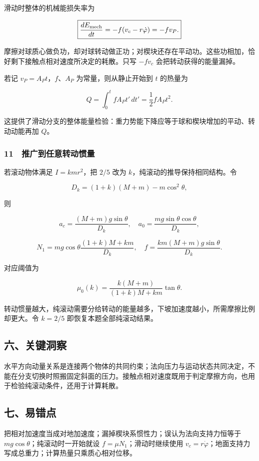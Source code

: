 \documentclass[12pt,a4paper,fontset=fandol]{ctexart}
\begin{document}
滑动时整体的机械能损失率为

\[\boxed{\frac{dE_{\rm mech}}{dt}=-f(v_c-r\dot\varphi)=-fv_P.}\]

摩擦对球质心做负功，却对球转动做正功；对楔块还存在平动功。这些功相加，恰好剩下接触点相对速度所决定的耗散。只写
\(-fv_c\) 会把转动获得的能量漏掉。

若记 \(v_P=A_Pt\)，\(f\)、\(A_P\) 为常量，则从静止开始到 \(t\) 的热量为

\[Q=\int_0^t fA_Pt'\,dt'=\frac12fA_Pt^2.\]

这提供了滑动分支的整体能量检验：重力势能下降应等于球和楔块增加的平动、转动动能再加
\(Q\)。

\subsubsection{11　推广到任意转动惯量}\label{ux63a8ux5e7fux5230ux4efbux610fux8f6cux52a8ux60efux91cf}

若滚动物体满足 \(I=kmr^2\)，把 \(2/5\) 改为
\(k\)，纯滚动的推导保持相同结构。令

\[D_k=(1+k)(M+m)-m\cos^2\theta,\]

则

\[a_c=\frac{(M+m)g\sin\theta}{D_k},\quad
a_0=\frac{mg\sin\theta\cos\theta}{D_k},\]

\[N_1=mg\cos\theta\frac{(1+k)M+km}{D_k},\quad
f=\frac{km(M+m)g\sin\theta}{D_k}.\]

对应阈值为

\[\boxed{\mu_0(k)=\frac{k(M+m)}{(1+k)M+km}\tan\theta.}\]

转动惯量越大，纯滚动需要分给转动的能量越多，下坡加速度越小，所需摩擦比例却更大。令
\(k=2/5\) 即恢复本题全部纯滚动结果。

\subsection{六、关键洞察}\label{ux516dux5173ux952eux6d1eux5bdf-2}

水平方向动量关系是连接两个物体的共同约束；法向压力与运动状态共同决定，不能在分支切换时照搬固定斜面的压力。接触点相对速度既用于判定摩擦方向，也用于检验纯滚动条件，还用于计算耗散。

\subsection{七、易错点}\label{ux4e03ux6613ux9519ux70b9-2}

把相对加速度当成对地加速度；漏掉楔块系惯性力；误认为法向支持力恒等于
\(mg\cos\theta\)；纯滚动时一开始就设 \(f=\mu N_1\)；滑动时继续使用
\(v_c=r\dot\varphi\)；地面支持力写成总重力；计算热量只乘质心相对位移。
\end{document}
